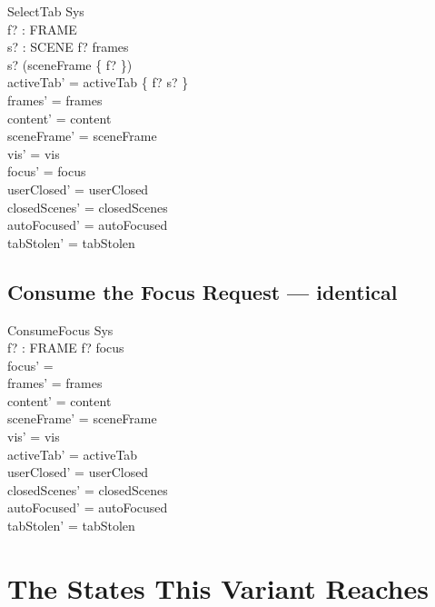 \documentclass[a4paper,10pt,fleqn]{article}
\begin{document}
\begin{schema}{SelectTab}
  \Delta Sys \\
  f? : FRAME \\
  s? : SCENE
\where
  f? \in frames \\
  s? \in \dom (sceneFrame \rres \{ f? \}) \\
  activeTab' = activeTab \oplus \{ f? \mapsto s? \} \\
  frames' = frames \\
  content' = content \\
  sceneFrame' = sceneFrame \\
  vis' = vis \\
  focus' = focus \\
  userClosed' = userClosed \\
  closedScenes' = closedScenes \\
  autoFocused' = autoFocused \\
  tabStolen' = tabStolen
\end{schema}

\subsection{Consume the Focus Request --- identical}

\begin{schema}{ConsumeFocus}
  \Delta Sys \\
  f? : FRAME
\where
  f? \in focus \\
  focus' = \emptyset \\
  frames' = frames \\
  content' = content \\
  sceneFrame' = sceneFrame \\
  vis' = vis \\
  activeTab' = activeTab \\
  userClosed' = userClosed \\
  closedScenes' = closedScenes \\
  autoFocused' = autoFocused \\
  tabStolen' = tabStolen
\end{schema}

\section{The States This Variant Reaches}
\end{document}
